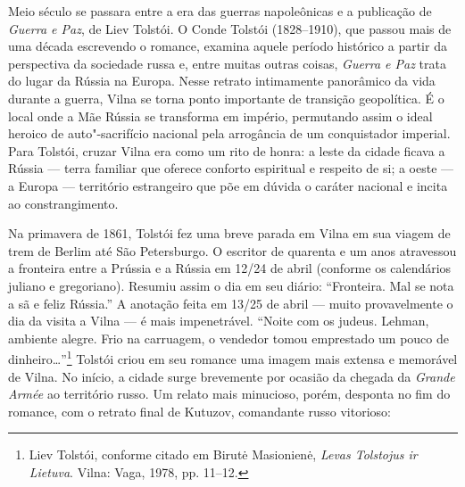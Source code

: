 Meio século se passara entre a era das guerras napoleônicas e a
publicação de \textit{Guerra e Paz}, de Liev Tolstói. O Conde Tolstói
(1828--1910), que passou mais de uma década escrevendo o romance, examina
aquele período histórico a partir da perspectiva da sociedade russa e,
entre muitas outras coisas, \textit{Guerra e Paz} trata do lugar da Rússia
na Europa. Nesse retrato intimamente panorâmico da vida durante a
guerra, Vilna se torna ponto importante de transição geopolítica. É o
local onde a Mãe Rússia se transforma em império, permutando assim o
ideal heroico de auto"-sacrifício nacional pela arrogância de um
conquistador imperial. Para Tolstói, cruzar Vilna era como um rito de
honra: a leste da cidade ficava a Rússia --- terra familiar que oferece
conforto espiritual e respeito de si; a oeste --- a Europa --- território
estrangeiro que põe em dúvida o caráter nacional e incita ao
constrangimento.

Na primavera de 1861, Tolstói fez uma breve parada em Vilna em sua
viagem de trem de Berlim até São Petersburgo. O escritor de quarenta e
um anos atravessou a fronteira entre a Prússia e a Rússia em 12/24 de
abril (conforme os calendários juliano e gregoriano). Resumiu assim o
dia em seu diário: ``Fronteira. Mal se nota a sã e feliz Rússia.'' A
anotação feita em 13/25 de abril --- muito provavelmente o dia da visita a
Vilna --- é mais impenetrável. ``Noite com os judeus. Lehman, ambiente
alegre. Frio na carruagem, o vendedor tomou emprestado um pouco de
dinheiro\ldots{}''\footnote{Liev Tolstói, conforme citado em Birutė Masionienė, \textit{Levas Tolstojus ir Lietuva}. Vilna: Vaga, 1978, pp. 11--12.} Tolstói criou em seu romance uma imagem mais extensa e memorável de Vilna. No início, a cidade surge brevemente por ocasião da
chegada da \textit{Grande Armée} ao território russo. Um relato mais
minucioso, porém, desponta no fim do romance, com o retrato final de
Kutuzov, comandante russo vitorioso:


